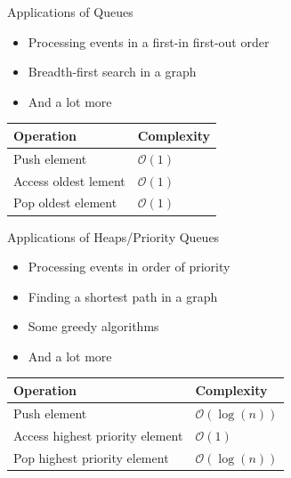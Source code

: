 \documentclass{beamer}
\begin{document}
\begin{frame}[plain]{Applications of Queues}
    \begin{itemize}
        \item Processing events in a first-in first-out order
        \item Breadth-first search in a graph
        \item And a lot more
    \end{itemize}
    \vspace*{1cm}
    \begin{center}
    \begin{tabular}{l|l}
    Operation & Complexity \\ \hline
    Push element & $\mathcal{O}(1)$ \\
    Access oldest lement & $\mathcal{O}(1)$ \\
    Pop oldest element & $\mathcal{O}(1)$ \\
    \end{tabular}
    \end{center}
\end{frame}

\begin{frame}[plain]{Applications of Heaps/Priority Queues}
    \begin{itemize}
        \item Processing events in order of priority
        \item Finding a shortest path in a graph
        \item Some greedy algorithms
        \item And a lot more
    \end{itemize}
    \vspace*{1cm}
    \begin{center}
    \begin{tabular}{l|l}
    Operation & Complexity \\ \hline
    Push element & $\mathcal{O}(\log(n))$ \\
    Access highest priority element & $\mathcal{O}(1)$ \\
    Pop highest priority element & $\mathcal{O}(\log(n))$ \\
    \end{tabular}
    \end{center}
\end{frame}
\end{document}
